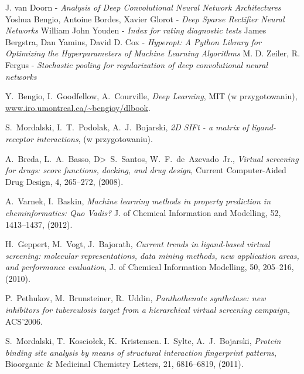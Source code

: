 \documentclass[a4paper,10pt]{report}
\begin{document}
  \begin{thebibliography}{99}
      J. van Doorn - \emph{Analysis of Deep Convolutional Neural Network Architectures}
      Yoshua Bengio, Antoine Bordes, Xavier Glorot - \emph{Deep Sparse Rectifier Neural Networks}
     William John Youden - \emph{Index for rating diagnostic tests}
      James Bergstra, Dan Yamins, David D. Cox - \emph{Hyperopt: A Python Library for Optimizing the Hyperparameters of Machine Learning Algorithms}
       M. D. Zeiler, R. Fergus - \emph{Stochastic pooling for regularization of deep convolutional neural networks}
       
      Y.~Bengio, I.~Goodfellow, A.~Courville,
      \textit{Deep Learning},
      MIT (w przygotowaniu),
      \url{www.iro.umontreal.ca/~bengioy/dlbook}.

      S.~Mordalski, I.~T.~Podolak, A.~J.~Bojarski,
      \textit{2D SIFt - a matrix of ligand-receptor interactions},
      (w przygotowaniu).

      A.~Breda, L.~A.~Basso, D>~S.~Santos, W.~F.~de~Azevado~Jr., 
      \textit{Virtual screening for drugs: score functions, docking, and drug design},
      Current Computer-Aided Drug Design, 4, 265--272,
      (2008).

      A.~Varnek, I.~Baskin,
      \textit{Machine learning methods in property prediction in cheminformatics: Quo Vadis?}
      J. of Chemical Information and Modelling, 52, 1413--1437,
      (2012).

      H.~Geppert, M.~Vogt, J.~Bajorath,
      \textit{Current trends in ligand-based virtual screening: molecular representations, data mining methods, new application areas, and performance evaluation},
      J. of Chemical Information Modelling, 50, 205--216,
      (2010).

      P.~Pethukov, M.~Brunsteiner, R.~Uddin,
      \textit{Panthothenate synthetase: new inhibitors for tuberculosis target from a hierarchical virtual screening campaign},
      ACS'2006.

      S.~Mordalski, T.~Kosciołek, K.~Kristensen. I.~Sylte, A.~J.~Bojarski,
      \textit{Protein binding site analysis by means of structural interaction fingerprint patterns},
      Bioorganic \& Medicinal Chemistry Letters, 21, 6816--6819,
      (2011).


\end{thebibliography}
\end{document}
